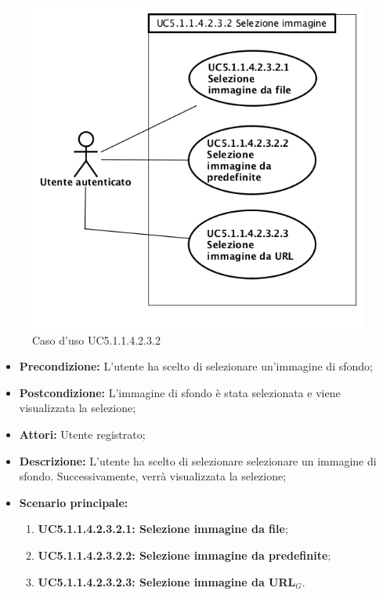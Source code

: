 \begin{figure}[h]
	\begin{center}
	\includegraphics[scale=0.4]{diagram/UC5-1-1-4-2-3-2.png}
	\caption{Caso d'uso UC5.1.1.4.2.3.2}
	\end{center}
\end{figure}
\begin{itemize}
	\item \textbf{Precondizione:} L'utente ha scelto di selezionare un'immagine di sfondo;
	\item \textbf{Postcondizione:} L'immagine di sfondo è stata selezionata e viene visualizzata la selezione;
	\item \textbf{Attori:} Utente registrato;
	\item \textbf{Descrizione:} L'utente ha scelto di selezionare selezionare un immagine di sfondo. Successivamente, verrà visualizzata la selezione;
	\item \textbf{Scenario principale:}
	\begin{enumerate}
		\item \textbf{ UC5.1.1.4.2.3.2.1: Selezione immagine da file};
		\item \textbf{ UC5.1.1.4.2.3.2.2: Selezione immagine da predefinite};
		\item \textbf{ UC5.1.1.4.2.3.2.3: Selezione immagine da URL$_G$}.
	\end{enumerate}
\end{itemize}
